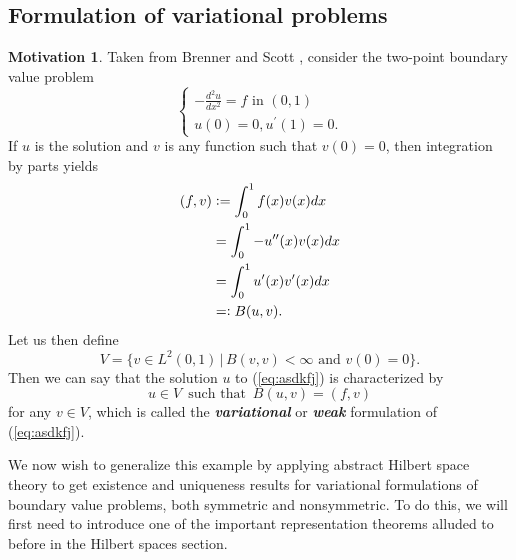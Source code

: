 \documentclass[11pt]{article}
\theoremstyle{definition}
\newtheorem*{motivation}{Motivation}
\newcommand{\defeq}{\vcentcolon=}
\newcommand{\eqdef}{=\vcentcolon}
\begin{document}
\subsection{Formulation of variational problems}
\begin{motivation}
	Taken from Brenner and Scott \cite{brenner2007mathematical}, consider the two-point boundary value problem
	\begin{equation}
		\label{eq:asdkfj}
		\begin{cases}
			-\frac{d^2u}{dx^2} = f \text{ in } (0,1) \\
			u(0) = 0, u^{\prime}(1) = 0.
		\end{cases}
	\end{equation}
	If $u$ is the solution and $v$ is any function such that $v(0) = 0$,
	then integration by parts yields
	\begin{equation*}
		\begin{aligned}
			(f,v) &\defeq \int_0^1 f(x)v(x)dx \\
			      &= \int_0^1 -u^{\prime\prime}(x)v(x)dx \\
			      &= \int_0^1 u^{\prime}(x)v^{\prime}(x)dx \\
			      &\eqdef B(u,v).
		\end{aligned}
	\end{equation*}
	Let us then define
	\begin{equation*}
		V = \{v \in L^2(0,1) \, | \, B(v,v) < \infty \text{ and } v(0) = 0\}.
	\end{equation*}
	Then we can say that the solution $u$ to (\ref{eq:asdkfj}) is characterized by
	\begin{equation*}
		u \in V \, \text{ such that } \, B(u,v) = (f,v)
	\end{equation*}
	for any $v \in V$, which is called the \textit{\textbf{variational}} or \textit{\textbf{weak}} formulation of (\ref{eq:asdkfj}).
\end{motivation}
We now wish to generalize this example by applying abstract Hilbert space theory to get existence and uniqueness
results for variational formulations of boundary value problems, both symmetric and nonsymmetric. To do this, we will
first need to introduce one of the important representation theorems alluded to before in the Hilbert spaces section.
\end{document}
